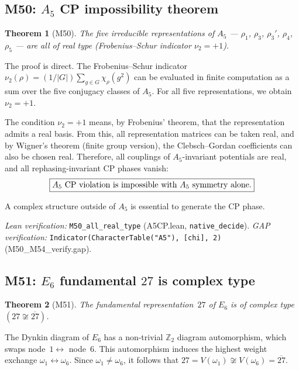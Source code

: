 \documentclass[sn-mathphys-num,Numbered]{sn-jnl}
\theoremstyle{thmstyleone}
\newtheorem{theorem}{Theorem}[section]
\theoremstyle{thmstylethree}
\begin{document}
\subsection{M50: $A_5$ CP impossibility theorem}\label{sec:M50}

\begin{theorem}[M50]\label{thm:M50}
The five irreducible representations of $A_5$ --- $\rho_1$, $\rho_3$,
$\rho_3'$, $\rho_4$, $\rho_5$ --- are all of real type
(Frobenius--Schur indicator $\nu_2 = +1$).
\end{theorem}

The proof is direct.  The Frobenius--Schur indicator $\nu_2(\rho) = (1/|G|)
\sum_{g \in G} \chi_\rho(g^2)$ can be evaluated in finite computation as a sum
over the five conjugacy classes of $A_5$.  For all five representations, we
obtain $\nu_2 = +1$.

The condition $\nu_2 = +1$ means, by Frobenius' theorem, that the
representation admits a real basis.  From this, all representation matrices can
be taken real, and by Wigner's theorem (finite group version), the
Clebsch--Gordan coefficients can also be chosen real.  Therefore, all
couplings of $A_5$-invariant potentials are real, and all rephasing-invariant
CP phases vanish:
\begin{equation}\label{eq:A5CPimpossible}
  \fbox{$A_5$ CP violation is impossible with $A_5$ symmetry alone.}
\end{equation}

A complex structure outside of $A_5$ is essential to generate the CP phase.

\noindent\textit{Lean verification:}
\texttt{M50\_all\_real\_type} (A5CP.lean, \texttt{native\_decide}).
\textit{GAP verification:} \texttt{Indicator(CharacterTable("A5"), [chi], 2)}
(M50\_M54\_verify.gap).


\subsection{M51: $E_6$ fundamental $27$ is complex type}\label{sec:M51}

\begin{theorem}[M51]\label{thm:M51}
The fundamental representation~$27$ of $E_6$ is of complex type
$(27 \not\cong \overline{27})$.
\end{theorem}

The Dynkin diagram of $E_6$ has a non-trivial $\mathbb{Z}_2$ diagram
automorphism, which swaps node~$1 \leftrightarrow$ node~$6$.  This
automorphism induces the highest weight exchange $\omega_1 \leftrightarrow
\omega_6$.  Since $\omega_1 \neq \omega_6$, it follows that
$27 = V(\omega_1) \not\cong V(\omega_6) = \overline{27}$.
\end{document}
